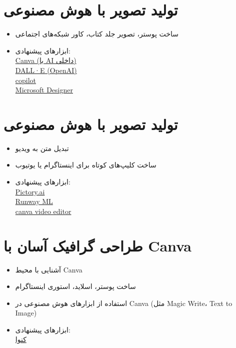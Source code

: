 \section{تولید تصویر با هوش مصنوعی}
\begin{itemize}
\item
ساخت پوستر، تصویر جلد کتاب، کاور شبکه‌های اجتماعی
\item
ابزارهای پیشنهادی:\\
\href{https://www.canva.com/}{Canva (با AI داخلی)}\\
\href{https://openai.com/index/dall-e-3/}{DALL·E (OpenAI)}\\
\href{https://copilot.microsoft.com/}{copilot}\\
\href{https://designer.microsoft.com/}{Microsoft Designer}\\
\end{itemize}
\section{تولید تصویر با هوش مصنوعی}
\begin{itemize}
\item
تبدیل متن به ویدیو
\item
ساخت کلیپ‌های کوتاه برای اینستاگرام یا یوتیوب
\item
ابزارهای پیشنهادی:\\
\href{https://pictory.ai/}{Pictory.ai}\\
\href{https://runwayml.com/}{Runway ML}\\
\href{https://www.canva.com/}{canva video editor}\\
\end{itemize}
\section{طراحی گرافیک آسان با Canva}
\begin{itemize}
\item
آشنایی با محیط Canva
\item
ساخت پوستر، اسلاید، استوری اینستاگرام
\item
استفاده از ابزارهای هوش مصنوعی در Canva (مثل Magic Write، Text to Image)
\item
ابزارهای پیشنهادی:\\
\href{https://www.canva.com/}{کنوا}
\end{itemize}
